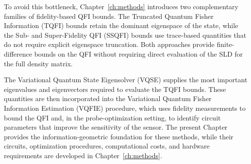 To avoid this bottleneck, Chapter~\ref{ch:methods} introduces two complementary families of fidelity-based QFI bounds. The Truncated Quantum Fisher Information (TQFI) bounds retain the dominant eigenspace of the state, while the Sub- and Super-Fidelity QFI (SSQFI) bounds use trace-based quantities that do not require explicit eigenspace truncation. Both approaches provide finite-difference bounds on the QFI without requiring direct evaluation of the SLD for the full density matrix.

The Variational Quantum State Eigensolver (VQSE) supplies the most important eigenvalues and eigenvectors required to evaluate the TQFI bounds. These quantities are then incorporated into the Variational Quantum Fisher Information Estimation (VQFIE) procedure, which uses fidelity measurements to bound the QFI and, in the probe-optimization setting, to identify circuit parameters that improve the sensitivity of the sensor. The present Chapter provides the information-geometric foundation for these methods, while their circuits, optimization procedures, computational costs, and hardware requirements are developed in Chapter~\ref{ch:methods}.
